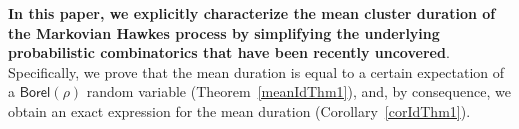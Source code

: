 \documentclass[opre,nonblindrev]{informs3_no_remark}
\newcommand{\tr}{\textcolor{red}}
\newcommand{\E}[1]{{\mathrm{E}\left[#1\right]}}
\begin{document}
\textbf{In this paper,  we explicitly characterize the mean cluster duration of the Markovian Hawkes process by simplifying the underlying probabilistic combinatorics that have been recently uncovered}. Specifically, we prove that the mean duration is equal to a certain expectation of a $\mathsf{Borel}(\rho)$ random variable (Theorem~\ref{meanIdThm1}), and, by consequence, we obtain an exact expression for the mean duration  (Corollary~\ref{corIdThm1}). 





\end{document}
